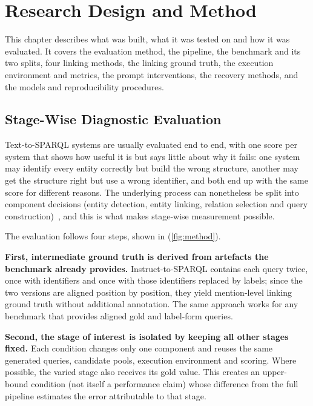 \chapter{Research Design and Method}

\label{ch:method}

This chapter describes what was built, what it was tested on and how it was evaluated.
It covers the evaluation method, the pipeline, the benchmark and its two splits, four linking methods, the linking ground truth, the execution environment and metrics, the prompt interventions, the recovery methods, and the models and reproducibility procedures.

\section{Stage-Wise Diagnostic
Evaluation}

Text-to-SPARQL systems are usually evaluated end to end, with one score per system that shows how useful it is but says little about why it fails: one system may identify every entity correctly but build the wrong structure, another may get the structure right but use a wrong identifier, and both end up with the same score for different reasons.
The underlying process can nonetheless be split into component decisions (entity detection, entity linking, relation selection and query construction)~\citep{mohammed2018strong}, and this is what makes stage-wise measurement possible.

The evaluation follows four steps, shown in (\cref{fig:method}).

\textbf{First, intermediate ground truth is derived from artefacts the benchmark already provides.}
Instruct-to-SPARQL contains each query twice, once with identifiers and once with those identifiers replaced by labels; since the two versions are aligned position by position, they yield mention-level linking ground truth without additional annotation.
The same approach works for any benchmark that provides aligned gold and label-form queries.

\textbf{Second, the stage of interest is isolated by keeping all other stages fixed.}
Each condition changes only one component and reuses the same generated queries, candidate pools, execution environment and scoring.
Where possible, the varied stage also receives its gold value.
This creates an upper-bound condition (not itself a performance claim) whose difference from the full pipeline estimates the error attributable to that stage.

